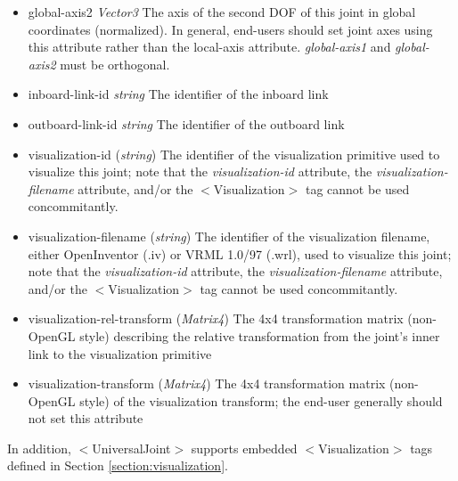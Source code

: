 \documentclass{article}
\begin{document}
\begin{landscape}
\begin{itemize}
\begin{itemize}
\item global-axis2  \emph{Vector3} The axis of the second DOF of this joint in global coordinates (normalized).  In general, end-users should set joint axes using this attribute rather than the local-axis attribute.  \emph{global-axis1} and \emph{global-axis2} must be orthogonal.
\item inboard-link-id  \emph{string} The identifier of the inboard link
\item outboard-link-id  \emph{string} The identifier of the outboard link
\item visualization-id (\emph{string})  The identifier of the visualization primitive used to visualize this joint; note that the \emph{visualization-id} attribute, the \emph{visualization-filename} attribute, and/or the $<$Visualization$>$ tag cannot be used concommitantly.
\item visualization-filename (\emph{string})  The identifier of the visualization filename, either OpenInventor (.iv) or VRML 1.0/97 (.wrl), used to visualize this joint; note that the \emph{visualization-id} attribute, the \emph{visualization-filename} attribute, and/or the $<$Visualization$>$ tag cannot be used concommitantly.
\item visualization-rel-transform (\emph{Matrix4})  The 4x4 transformation matrix (non-OpenGL style) describing the relative transformation from the joint's inner link to the visualization primitive
\item visualization-transform (\emph{Matrix4})  The 4x4 transformation matrix (non-OpenGL style) of the visualization transform; the end-user generally should not set this attribute
\end{itemize}

In addition, $<$UniversalJoint$>$ supports embedded $<$Visualization$>$ tags defined in Section \ref{section:visualization}.



\end{itemize}
\end{landscape}
\end{document}
